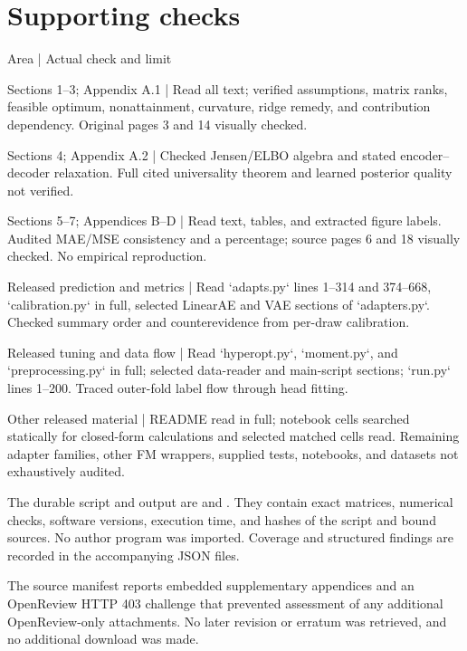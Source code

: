 \documentclass[10pt]{article}
\begin{document}
\section*{Supporting checks}
Area | Actual check and limit\par
Sections 1–3; Appendix A.1 | Read all text; verified assumptions, matrix ranks, feasible optimum, nonattainment, curvature, ridge remedy, and contribution dependency. Original pages 3 and 14 visually checked.\par
Sections 4; Appendix A.2 | Checked Jensen/ELBO algebra and stated encoder–decoder relaxation. Full cited universality theorem and learned posterior quality not verified.\par
Sections 5–7; Appendices B–D | Read text, tables, and extracted figure labels. Audited MAE/MSE consistency and a percentage; source pages 6 and 18 visually checked. No empirical reproduction.\par
Released prediction and metrics | Read `adapts.py` lines 1–314 and 374–668, `calibration.py` in full, selected LinearAE and VAE sections of `adapters.py`. Checked summary order and counterevidence from per-draw calibration.\par
Released tuning and data flow | Read `hyperopt.py`, `moment.py`, and `preprocessing.py` in full; selected data-reader and main-script sections; `run.py` lines 1–200. Traced outer-fold label flow through head fitting.\par
Other released material | README read in full; notebook cells searched statically for closed-form calculations and selected matched cells read. Remaining adapter families, other FM wrappers, supplied tests, notebooks, and datasets not exhaustively audited.\par
The durable script and output are and . They contain exact matrices, numerical checks, software versions, execution time, and hashes of the script and bound sources. No author program was imported. Coverage and structured findings are recorded in the accompanying JSON files.\par
The source manifest reports embedded supplementary appendices and an OpenReview HTTP 403 challenge that prevented assessment of any additional OpenReview-only attachments. No later revision or erratum was retrieved, and no additional download was made.\par
\end{document}
